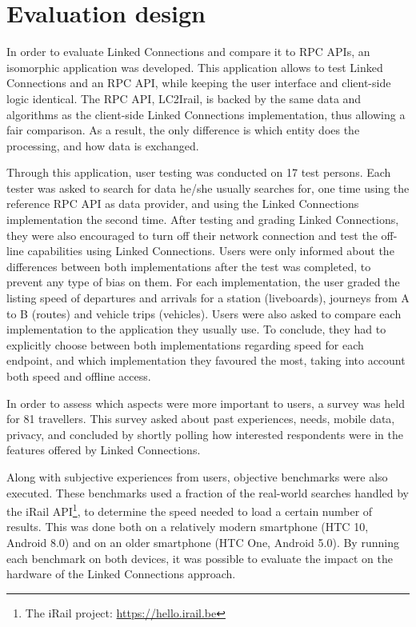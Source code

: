 \documentclass[twocolumn]{phdsymp} %
\begin{document}
\section{Evaluation design}

In order to evaluate Linked Connections and compare it to \textsc{RPC} APIs, an isomorphic application was developed. This application allows to test Linked Connections and an \textsc{RPC} API, while keeping the user interface and client-side logic identical. The \textsc{RPC} API, LC2Irail, is backed by the same data and algorithms as the client-side Linked Connections implementation, thus allowing a fair comparison. As a result, the only difference is which entity does the processing, and how data is exchanged.

Through this application, user testing was conducted on 17 test persons. Each tester was asked to search for data he/she usually searches for, one time using the reference \textsc{RPC} API as data provider, and using the Linked Connections implementation the second time. After testing and grading Linked Connections, they were also encouraged to turn off their network connection and test the off-line capabilities using Linked Connections. Users were only informed about the differences between both implementations after the test was completed, to prevent any type of bias on them. For each implementation, the user graded the listing speed of departures and arrivals for a station (liveboards), journeys from A to B (routes) and vehicle trips (vehicles). Users were also asked to compare each implementation to the application they usually use. To conclude, they had to explicitly choose between both implementations regarding speed for each endpoint, and which implementation they favoured the most, taking into account both speed and offline access.

In order to assess which aspects were more important to users, a survey was held for 81 travellers. This survey asked about past experiences, needs, mobile data, privacy, and concluded by shortly polling how interested respondents were in the features offered by Linked Connections.

Along with subjective experiences from users, objective benchmarks were also executed. These benchmarks used a fraction of the real-world searches handled by the iRail API\footnote{The iRail project: \url{https://hello.irail.be}}, to determine the speed needed to load a certain number of results. This was done both on a relatively modern smartphone (HTC 10, Android 8.0) and on an older smartphone (HTC One, Android 5.0). By running each benchmark on both devices, it was possible to evaluate the impact on the hardware of the Linked Connections approach.
\end{document}
